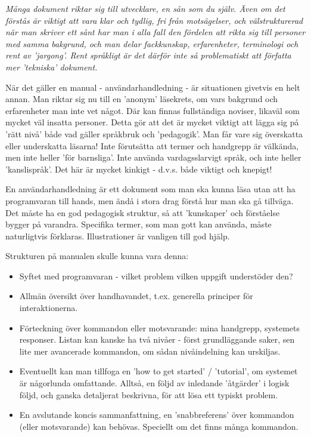 \em Många dokument riktar sig till utvecklare, en sån som du själv. Även om det förstås är viktigt att vara klar och tydlig, fri från motsägelser, och välstrukturerad när man skriver ett sånt har man i alla fall den fördelen att rikta sig till personer med samma bakgrund, och man delar fackkunskap, erfarenheter, terminologi och rent av 'jargong'. Rent språkligt är det därför inte så problematiskt att författa mer 'tekniska' dokument.

När det gäller en manual - användarhandledning - är situationen givetvis en helt annan. Man riktar sig nu till en 'anonym' läsekrets, om vars bakgrund och erfarenheter man inte vet något. Där kan finnas fullständiga noviser, likaväl som mycket väl insatta personer. Detta gör att det är mycket viktigt att lägga sig på 'rätt nivå' både vad gäller språkbruk och 'pedagogik'. Man får vare sig överskatta eller underskatta läsarna! Inte förutsätta att termer och handgrepp är välkända, men inte heller 'för barnsliga'. Inte använda vardagsslarvigt språk, och inte heller 'kanslispråk'. Det här är mycket kinkigt - d.v.s. både viktigt och knepigt!

En användarhandledning är ett dokument som man ska kunna läsa utan att ha programvaran till hands, men ändå i stora drag förstå hur man ska gå tillväga. Det måste ha en god pedagogisk struktur, så att 'kunskaper' och förståelse bygger på varandra. Specifika termer, som man gott kan använda, måste naturligtvis förklaras. Illustrationer är vanligen till god hjälp.

Strukturen på manualen skulle kunna vara denna:

\begin{itemize}
\item Syftet med programvaran - vilket problem vilken uppgift understöder den?
\item Allmän översikt över handhavandet, t.ex. generella principer för interaktionerna.
\item Förteckning över kommandon eller motsvarande: mina handgrepp, systemets responser. Listan kan kanske ha två nivåer - först grundläggande saker, sen lite mer avancerade kommandon, om sådan nivåindelning kan urskiljas.
\item Eventuellt kan man tillfoga en 'how to get started' / 'tutorial', om systemet är någorlunda omfattande. Alltså, en följd av inledande 'åtgärder' i logisk följd, och ganska detaljerat beskrivna, för att lösa ett typiskt problem.
\item En avslutande koncis sammanfattning, en 'snabbreferens' över kommandon (eller motsvarande) kan behövas. Speciellt om det finns många kommandon.
\end{itemize}
\em

